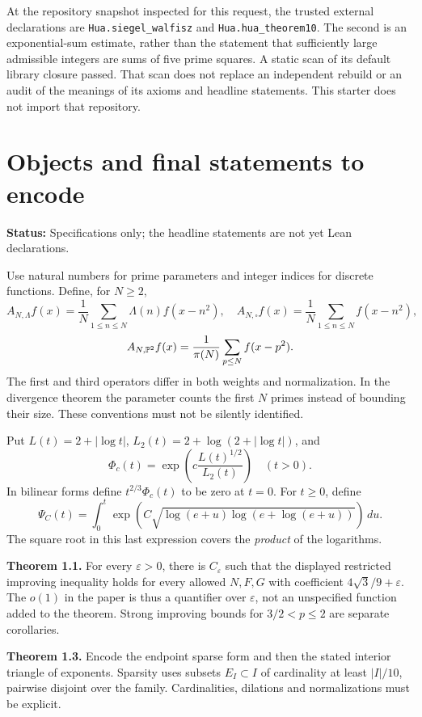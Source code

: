 \documentclass[11pt]{article}
\newcommand{\lean}[1]{\nolinkurl{#1}}
\newcommand{\status}[1]{\textbf{Status:} #1.}
\newcommand{\page}{\newpage}
\begin{document}
At the repository snapshot inspected for this request, the trusted external
declarations are \lean{Hua.siegel_walfisz} and \lean{Hua.hua_theorem10}. The second
is an exponential-sum estimate, rather than the statement that sufficiently large
admissible integers are sums of five prime squares. A static scan of its default
library closure passed. That scan does not replace an independent rebuild or an
audit of the meanings of its axioms and headline statements. This starter does not
import that repository.

\page
\section{Objects and final statements to encode}
\status{Specifications only; the headline statements are not yet Lean declarations}

Use natural numbers for prime parameters and integer indices for discrete
functions. Define, for \(N\ge2\),
\[
 A_{N,\Lambda}f(x)=\frac1N\sum_{1\le n\le N}\Lambda(n)f(x-n^2),\quad
 A_{N,\square}f(x)=\frac1N\sum_{1\le n\le N}f(x-n^2),
\]
\[
 A_{N,\mathbb P^2}f(x)=\frac1{\pi(N)}\sum_{p\le N}f(x-p^2).
\]
The first and third operators differ in both weights and normalization. In the
divergence theorem the parameter counts the first \(N\) primes instead of bounding
their size. These conventions must not be silently identified.

Put \(L(t)=2+|\log t|\), \(L_2(t)=2+\log(2+|\log t|)\), and
\[
 \Phi_c(t)=\exp\!\left(c\frac{L(t)^{1/2}}{L_2(t)}\right)\quad(t>0).
\]
In bilinear forms define \(t^{2/3}\Phi_c(t)\) to be zero at \(t=0\).
For \(t\ge0\), define
\[
 \Psi_C(t)=\int_0^t
 \exp\!\left(C\sqrt{\log(e+u)\log(e+\log(e+u))}\right)\,du.
\]
The square root in this last expression covers the \emph{product} of the logarithms.

\textbf{Theorem 1.1.} For every \(\varepsilon>0\), there is \(C_\varepsilon\) such
that the displayed restricted improving inequality holds for every allowed \(N,F,G\)
with coefficient \(4\sqrt3/9+\varepsilon\). The \(o(1)\) in the paper is thus a
quantifier over \(\varepsilon\), not an unspecified function added to the theorem.
Strong improving bounds for \(3/2<p\le2\) are separate corollaries.

\textbf{Theorem 1.3.} Encode the endpoint sparse form and then the stated interior
triangle of exponents. Sparsity uses subsets \(E_I\subset I\) of cardinality at
least \(|I|/10\), pairwise disjoint over the family. Cardinalities, dilations and
normalizations must be explicit.
\end{document}
